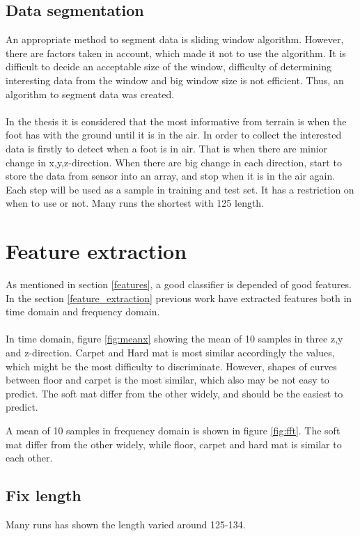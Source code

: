\documentclass[USenglish]{ifimaster}  %
\begin{document}
\subsection{Data segmentation}
An appropriate method to segment data is sliding window algorithm. However, there are factors taken in account, which made it not to use the algorithm. It is difficult to decide an acceptable size of the window, difficulty of determining interesting data from the window and big window size is not efficient. Thus, an algorithm to segment data was created. 
\\
\\
In the thesis it is considered that the most informative from terrain is when the foot has with the ground until it is in the air. In order to collect the interested data is firstly to detect when a foot is in air. That is when there are minior change in x,y,z-direction. When there are big change in each direction, start to store the data from sensor into an array, and stop when it is in the air again. Each step will be used as a sample in training and test set. It has a restriction on when to use or not. Many runs the shortest with 125 length.


\section{Feature extraction}
As mentioned in section \ref{features}, a good classifier is depended of  good features. In the section \ref{feature_extraction} previous work have extracted features both in time domain and frequency domain. 
\\
\\
In time domain, figure \ref{fig:meanx} showing the mean of 10 samples in three z,y and z-direction. Carpet and Hard mat is most similar accordingly the values, which might be the most difficulty to discriminate. However, shapes of curves between floor and carpet is the most similar, which also may be not easy to predict. The soft mat differ from the other widely, and should be the easiest to predict. 

A mean of 10 samples in frequency domain is shown in figure \ref{fig:fft}. The soft mat differ from the other widely, while floor, carpet and hard mat is similar to each other.

\subsection{Fix length}
Many runs has shown the length varied around 125-134.
\end{document}
